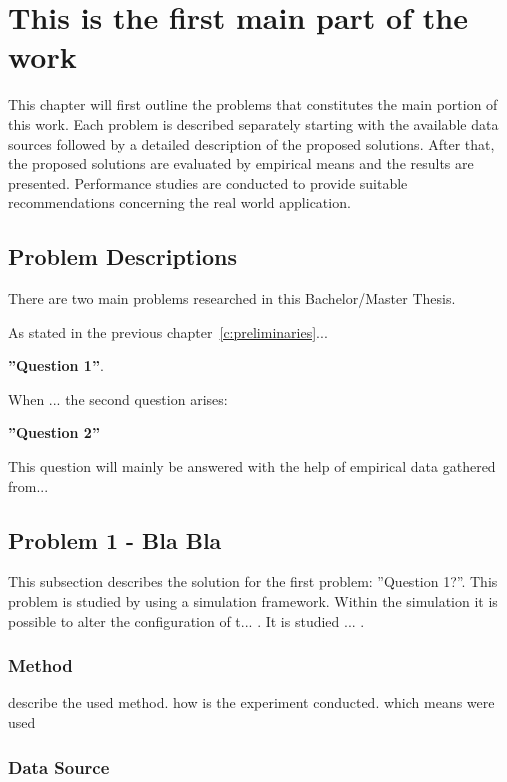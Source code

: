 \chapter{This is the first main part of the work}
\label{c:mainpart1}

This chapter will first outline the problems that constitutes the main portion of this work. Each problem is described separately starting with the available data sources followed by a detailed description of the proposed solutions. After that, the proposed solutions are evaluated by empirical means and the results are presented. Performance studies are conducted to provide suitable recommendations concerning the real world application.



\section{Problem Descriptions}
\label{s:prob_describtion}

There are two main problems researched in this Bachelor/Master Thesis.

As stated in the previous chapter~\ref{c:preliminaries}...

\textbf{''Question 1''}. 

When ... the second question arises: 

\textbf{''Question 2''}

This question will mainly be answered with the help of empirical data gathered from...


\section{Problem 1 - Bla Bla}
\label{s:solution_prob_1}

This subsection describes the solution for the first problem: ''Question 1?''. This problem is studied by using a simulation framework. Within the simulation it is possible to alter the configuration of t... . It is studied ... .



\subsection{Method}
\label{ss:method}

describe the used method. how is the experiment conducted. which means were used

\subsection{Data Source}
\label{ss:datasource}

